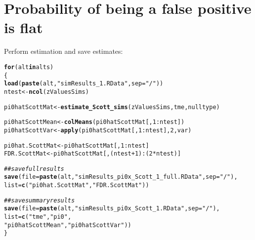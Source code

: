 \documentclass{article}\usepackage[]{graphicx}\usepackage[]{color}
\makeatletter
\newcommand{\hlnum}[1]{\textcolor[rgb]{0.686,0.059,0.569}{#1}}%
\newcommand{\hlstr}[1]{\textcolor[rgb]{0.192,0.494,0.8}{#1}}%
\newcommand{\hlcom}[1]{\textcolor[rgb]{0.678,0.584,0.686}{\textit{#1}}}%
\newcommand{\hlopt}[1]{\textcolor[rgb]{0,0,0}{#1}}%
\newcommand{\hlstd}[1]{\textcolor[rgb]{0.345,0.345,0.345}{#1}}%
\newcommand{\hlkwa}[1]{\textcolor[rgb]{0.161,0.373,0.58}{\textbf{#1}}}%
\newcommand{\hlkwb}[1]{\textcolor[rgb]{0.69,0.353,0.396}{#1}}%
\newcommand{\hlkwc}[1]{\textcolor[rgb]{0.333,0.667,0.333}{#1}}%
\newcommand{\hlkwd}[1]{\textcolor[rgb]{0.737,0.353,0.396}{\textbf{#1}}}%
\newenvironment{kframe}{%
 \def\at@end@of@kframe{}%
 \ifinner\ifhmode%
  \def\at@end@of@kframe{\end{minipage}}%
  \begin{minipage}{\columnwidth}%
 \fi\fi%
 \def\FrameCommand##1{\hskip\@totalleftmargin \hskip-\fboxsep
 \colorbox{shadecolor}{##1}\hskip-\fboxsep
     \hskip-\linewidth \hskip-\@totalleftmargin \hskip\columnwidth}%
 \MakeFramed {\advance\hsize-\width
   \@totalleftmargin\z@ \linewidth\hsize
   \@setminipage}}%
 {\par\unskip\endMakeFramed%
 \at@end@of@kframe}
\newenvironment{knitrout}{}{} %
\makeatother
\begin{document}
\section{Probability of being a false positive is flat}

Perform estimation and save estimates:

\begin{knitrout}
\color{fgcolor}\begin{kframe}
\begin{alltt}
\hlkwa{for}\hlstd{(alt} \hlkwa{in} \hlstd{alts)}
\hlstd{\{}
  \hlkwd{load}\hlstd{(}\hlkwd{paste}\hlstd{(alt,}\hlstr{"simResults_1.RData"}\hlstd{,}\hlkwc{sep}\hlstd{=}\hlstr{"/"}\hlstd{))}
  \hlstd{ntest} \hlkwb{<-} \hlkwd{ncol}\hlstd{(zValuesSims)}

  \hlstd{pi0hatScottMat} \hlkwb{<-} \hlkwd{estimate_Scott_sims}\hlstd{(zValuesSims, tme, nulltype)}

  \hlstd{pi0hatScottMean} \hlkwb{<-} \hlkwd{colMeans}\hlstd{(pi0hatScottMat[,}\hlnum{1}\hlopt{:}\hlstd{ntest])}
  \hlstd{pi0hatScottVar} \hlkwb{<-} \hlkwd{apply}\hlstd{(pi0hatScottMat[,}\hlnum{1}\hlopt{:}\hlstd{ntest],}\hlnum{2}\hlstd{,var)}

  \hlstd{pi0hat.ScottMat} \hlkwb{<-} \hlstd{pi0hatScottMat[,}\hlnum{1}\hlopt{:}\hlstd{ntest]}
  \hlstd{FDR.ScottMat} \hlkwb{<-} \hlstd{pi0hatScottMat[,(ntest}\hlopt{+}\hlnum{1}\hlstd{)}\hlopt{:}\hlstd{(}\hlnum{2}\hlopt{*}\hlstd{ntest)]}

  \hlcom{##save full results}
  \hlkwd{save}\hlstd{(}\hlkwc{file}\hlstd{=}\hlkwd{paste}\hlstd{(alt,}\hlstr{"simResults_pi0x_Scott_1_full.RData"}\hlstd{,}\hlkwc{sep}\hlstd{=}\hlstr{"/"}\hlstd{),}
       \hlkwc{list}\hlstd{=}\hlkwd{c}\hlstd{(}\hlstr{"pi0hat.ScottMat"}\hlstd{,} \hlstr{"FDR.ScottMat"}\hlstd{))}

  \hlcom{##save summary results}
  \hlkwd{save}\hlstd{(}\hlkwc{file}\hlstd{=}\hlkwd{paste}\hlstd{(alt,}\hlstr{"simResults_pi0x_Scott_1.RData"}\hlstd{,}\hlkwc{sep}\hlstd{=}\hlstr{"/"}\hlstd{),}
       \hlkwc{list}\hlstd{=}\hlkwd{c}\hlstd{(}\hlstr{"tme"}\hlstd{,} \hlstr{"pi0"}\hlstd{,}
            \hlstr{"pi0hatScottMean"}\hlstd{,}\hlstr{"pi0hatScottVar"}\hlstd{))}
\hlstd{\}}
\end{alltt}


{\ttfamily\noindent\color{warningcolor}{\#\# Warning in apply(as.matrix(pi0hatScottMat), 2, as.numeric): NAs introduced by coercion}}

{\ttfamily\noindent\bfseries\color{errorcolor}{\#\# Error in apply(as.matrix(pi0hatScottMat), 2, as.numeric): (list) object cannot be coerced to type 'double'}}\end{kframe}
\end{knitrout}
\end{document}
